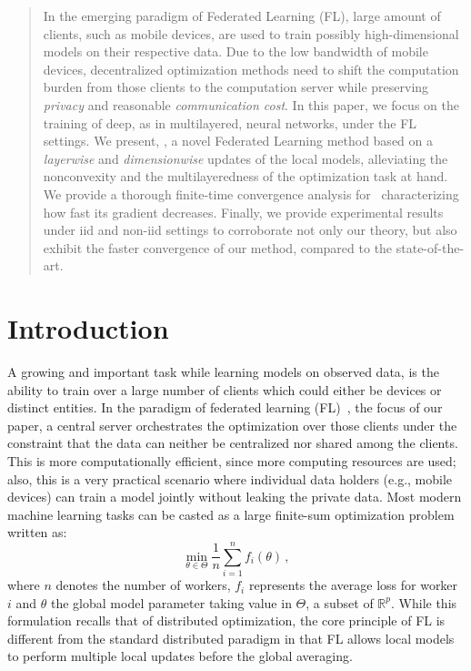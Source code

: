 \documentclass[twoside]{article}
\begin{document}

\begin{abstract}
In the emerging paradigm of Federated Learning (FL), large amount of clients, such as mobile devices, are used to train possibly high-dimensional models on their respective data.
Due to the low bandwidth of mobile devices, decentralized optimization methods need to shift the computation burden from those clients to the computation server while preserving \emph{privacy} and reasonable \emph{communication cost}.
In this paper, we focus on the training of deep, as in multilayered, neural networks, under the FL settings.
We present, \algo, a novel Federated Learning method based on a \emph{layerwise} and \emph{dimensionwise} updates of the local models, alleviating the nonconvexity and the multilayeredness of the optimization task at hand.
We provide a thorough finite-time convergence analysis for \algo\ characterizing how fast its gradient decreases.
Finally, we provide experimental results under iid and non-iid settings to corroborate not only our theory, but also exhibit the faster convergence of our method, compared to the state-of-the-art.
\end{abstract}



\vspace{-0.1in}
\section{Introduction}\label{sec:introduction}

A growing and important task while learning models on observed data, is the ability to train over a large number of clients which could either be devices or distinct entities.
In the paradigm of federated learning (FL)~\citep{konevcny2016federated,mcmahan2017communication}, the focus of our paper, a central server orchestrates the optimization over those clients under the constraint that the data can neither be centralized nor shared among the clients.
This is more computationally efficient, since more computing resources are used; also, this is a very practical scenario where individual data holders (e.g., mobile devices) can train a model jointly without leaking the private data. Most modern machine learning tasks can be casted as a large finite-sum optimization problem written as:
\begin{equation}\label{eq:opt}
\min \limits_{\theta \in \Theta} \frac{1}{n} \sum_{i=1}^n f_i(\theta) \, ,
\end{equation}
where $n$ denotes the number of workers, $f_i$ represents the average loss for worker $i$ and $\theta$ the global model parameter taking value in $\Theta$, a subset of $\mathbb{R}^p$.
While this formulation recalls that of distributed optimization, the core principle of FL is different from the standard distributed paradigm in that FL allows local models to perform multiple local updates before the global averaging.
\end{document}
